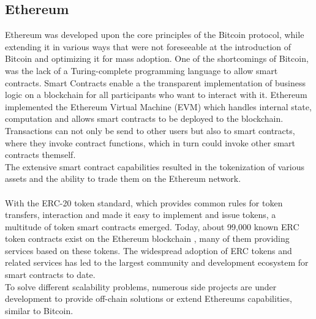 \subsection{Ethereum}
Ethereum was developed upon the core principles of the Bitcoin protocol, while extending it in various ways that were not foreseeable at the introduction of Bitcoin and optimizing it for mass adoption. One of the shortcomings of Bitcoin, was the lack of a Turing-complete programming language to allow smart contracts. Smart Contracts
enable a the transparent implementation of business logic on a blockchain for all participants who want to interact with it.
Ethereum implemented the Ethereum Virtual Machine (EVM) which handles internal state, computation and allows smart contracts to be deployed to the blockchain. Transactions can not only be send to other users but also to smart contracts, where they invoke contract functions, which in turn could invoke other smart contracts themself.
\\
The extensive smart contract capabilities resulted in the tokenization of various assets and the ability to trade them on the Ethereum network. \\ \\
With the ERC-20 token standard, which provides common rules for token transfers, interaction and made it easy to implement and issue tokens, a multitude of token smart contracts emerged. Today, about 99,000 known ERC token contracts exist on the Ethereum blockchain \cite{Etherscan1:online}, many of them providing services based on these tokens. The widespread adoption of ERC tokens and related services has led to the largest community and development ecosystem for smart contracts to date.
\\
To solve different scalability problems, numerous side projects are under development to provide off-chain solutions \cite{eberhardt2017or} or extend Ethereums capabilities, similar to Bitcoin.

